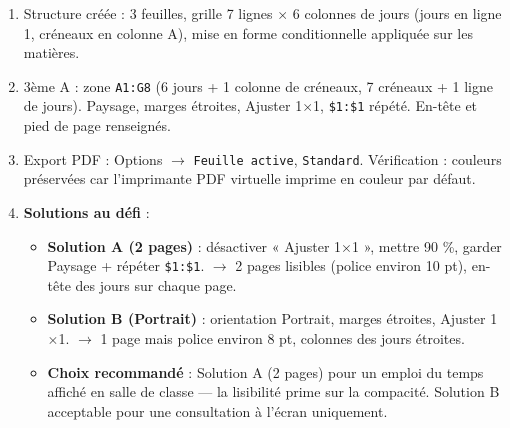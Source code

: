 \documentclass[11pt]{article}
\begin{document}
\begin{corrige}[Exercice n°1-4]
\begin{enumerate}
  \item Structure créée : 3 feuilles, grille 7 lignes $\times$ 6 colonnes de jours (jours en ligne 1, créneaux en colonne A), mise en forme conditionnelle appliquée sur les matières.
  \item 3ème A : zone \texttt{A1:G8} (6 jours + 1 colonne de créneaux, 7 créneaux + 1 ligne de jours). Paysage, marges étroites, Ajuster 1$\times$1, \texttt{\$1:\$1} répété. En-tête et pied de page renseignés.
  \item Export PDF : Options $\rightarrow$ \texttt{Feuille active}, \texttt{Standard}. Vérification : couleurs préservées car l'imprimante PDF virtuelle imprime en couleur par défaut.
  \item \textbf{Solutions au défi} :
    \begin{itemize}
      \item \textbf{Solution A (2 pages)} : désactiver « Ajuster 1$\times$1 », mettre 90 \%, garder Paysage + répéter \texttt{\$1:\$1}. $\rightarrow$ 2 pages lisibles (police environ 10 pt), en-tête des jours sur chaque page.
      \item \textbf{Solution B (Portrait)} : orientation Portrait, marges étroites, Ajuster 1$\times$1. $\rightarrow$ 1 page mais police environ 8 pt, colonnes des jours étroites.
      \item \textbf{Choix recommandé} : Solution A (2 pages) pour un emploi du temps affiché en salle de classe — la lisibilité prime sur la compacité. Solution B acceptable pour une consultation à l'écran uniquement.
    \end{itemize}
\end{enumerate}
\end{corrige}
\end{document}
